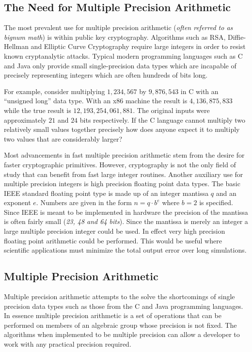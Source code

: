 \documentclass[b5paper]{book}
\begin{document}
\subsection{The Need for Multiple Precision Arithmetic}
The most prevalent use for multiple precision arithmetic (\textit{often referred to as bignum math}) is within public
key cryptography.   Algorithms such as RSA, Diffie-Hellman and Elliptic Curve Cryptography require large integers in order to 
resist known cryptanalytic attacks.  Typical modern programming languages such as C and Java only provide small 
single-precision data types which are incapable of precisely representing integers which are often hundreds of bits long.

For example, consider multiplying $1,234,567$ by $9,876,543$ in C with an ``unsigned long'' data type.  With an 
x86 machine the result is $4,136,875,833$ while the true result is $12,193,254,061,881$.  The original inputs 
were approximately $21$ and $24$ bits respectively.  If the C language cannot multiply two relatively small values 
together precisely how does anyone expect it to multiply two values that are considerably larger?

Most advancements in fast multiple precision arithmetic stem from the desire for faster cryptographic primitives.  However, cryptography
is not the only field of study that can benefit from fast large integer routines.  Another auxiliary use for multiple precision integers is 
high precision floating point data types.  The basic IEEE standard floating point type is made up of an integer mantissa $q$ and an exponent $e$.  
Numbers are given in the form $n = q \cdot b^e$ where $b = 2$ is specified.  Since IEEE is meant to be implemented in 
hardware the precision of the mantissa is often fairly small (\textit{23, 48 and 64 bits}).  Since the mantissa is merely an 
integer a large multiple precision integer could be used.  In effect very high precision floating point arithmetic 
could be performed.  This would be useful where scientific applications must minimize the total output error over long simulations.  

\subsection{Multiple Precision Arithmetic}
Multiple precision arithmetic attempts to the solve the shortcomings of single precision data types such as those from
the C and Java programming languages.  In essence multiple precision arithmetic is a set of operations that can be 
performed on members of an algebraic group whose precision is not fixed.  The algorithms when implemented to be multiple
precision can allow a developer to work with any practical precision required.
\end{document}
